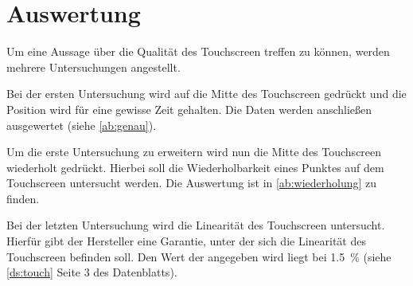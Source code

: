 \chapter{Auswertung}








Um eine Aussage über die Qualität des Touchscreen treffen zu können, werden mehrere Untersuchungen angestellt.

Bei der ersten Untersuchung wird auf die Mitte des Touchscreen gedrückt und die Position wird für eine gewisse Zeit gehalten.
Die Daten werden anschließen ausgewertet (siehe \cref{ab:genau}).

Um die erste Untersuchung zu erweitern wird nun die Mitte des Touchscreen wiederholt gedrückt.
Hierbei soll die Wiederholbarkeit eines Punktes auf dem Touchscreen untersucht werden.
Die Auswertung ist in \cref{ab:wiederholung} zu finden.

Bei der letzten Untersuchung wird die Linearität des Touchscreen untersucht.
Hierfür gibt der Hersteller eine Garantie, unter der sich die Linearität des Touchscreen befinden soll.
Den Wert der angegeben wird liegt bei \SI{1,5}{\%} (siehe \cref{ds:touch} Seite 3 des Datenblatts).

